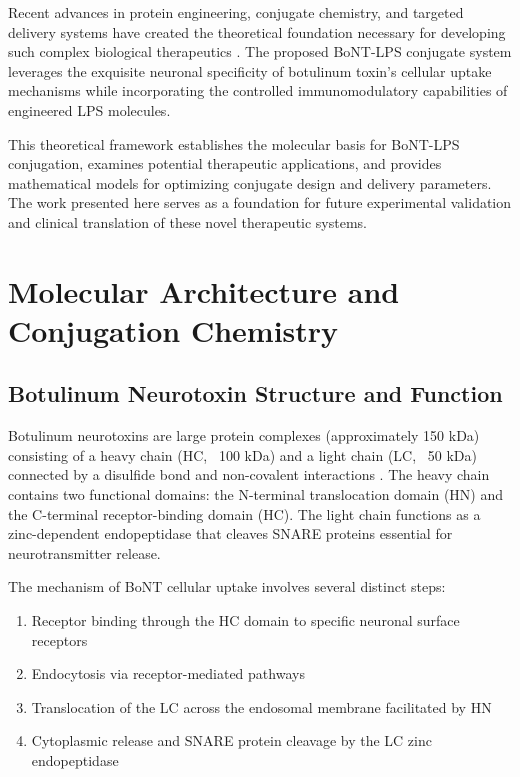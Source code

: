 \documentclass[11pt,a4paper]{article}
\begin{document}
Recent advances in protein engineering, conjugate chemistry, and targeted delivery systems have created the theoretical foundation necessary for developing such complex biological therapeutics \cite{Schiavo2000}. The proposed BoNT-LPS conjugate system leverages the exquisite neuronal specificity of botulinum toxin's cellular uptake mechanisms while incorporating the controlled immunomodulatory capabilities of engineered LPS molecules.

This theoretical framework establishes the molecular basis for BoNT-LPS conjugation, examines potential therapeutic applications, and provides mathematical models for optimizing conjugate design and delivery parameters. The work presented here serves as a foundation for future experimental validation and clinical translation of these novel therapeutic systems.

\section{Molecular Architecture and Conjugation Chemistry}

\subsection{Botulinum Neurotoxin Structure and Function}

Botulinum neurotoxins are large protein complexes (approximately 150 kDa) consisting of a heavy chain (HC, ~100 kDa) and a light chain (LC, ~50 kDa) connected by a disulfide bond and non-covalent interactions \cite{Lacy2005}. The heavy chain contains two functional domains: the N-terminal translocation domain (HN) and the C-terminal receptor-binding domain (HC). The light chain functions as a zinc-dependent endopeptidase that cleaves SNARE proteins essential for neurotransmitter release.

The mechanism of BoNT cellular uptake involves several distinct steps:
\begin{enumerate}
\item Receptor binding through the HC domain to specific neuronal surface receptors
\item Endocytosis via receptor-mediated pathways
\item Translocation of the LC across the endosomal membrane facilitated by HN
\item Cytoplasmic release and SNARE protein cleavage by the LC zinc endopeptidase
\end{enumerate}
\end{document}
